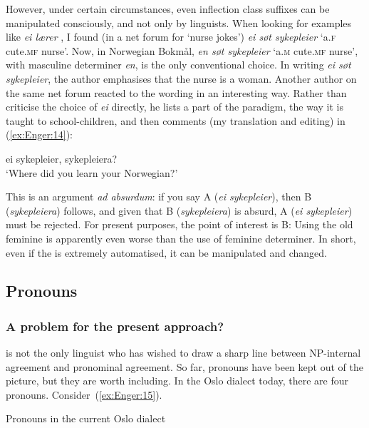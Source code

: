 \documentclass[output=paper]{langsci/langscibook}
\begin{document}
\begin{exe}
\begin{xlist}
\begin{xlist}
However, under certain circumstances, even inflection class suffixes can
be manipulated consciously, and not only by linguists. When looking for
examples like \emph{ei lærer} %
\citep[Section 2.4.2,][]{Enger15}%
%
, I found (in a net
forum for `nurse jokes') \emph{ei søt sykepleier} `a.\textsc{f} cute.\textsc{mf} nurse'.
Now, in Norwegian Bokmål, \emph{en søt sykepleier} `a.\textsc{m} cute.\textsc{mf} nurse',
with masculine determiner \emph{en}, is the only conventional choice. In
writing \emph{ei søt sykepleier}, the author emphasises that the nurse
is a woman. Another author on the same net forum reacted to the wording
in an interesting way. Rather than criticise the choice of \emph{ei}
directly, he lists a part of the paradigm, the way it is taught to
school-children, and then comments (my translation and editing) in (\ref{ex:Enger:14}):

\ea\label{ex:Enger:14} {ei sykepleier, sykepleiera}?\\
\glt `Where did you learn your
Norwegian?'
\z

This is an argument \emph{ad absurdum}: if you say A (\emph{ei
sykepleier}), then B (\emph{sykepleiera}) follows, and given that B
(\emph{sykepleiera}) is absurd, A (\emph{ei sykepleier}) must be
rejected. For present purposes, the point of interest is B: Using the
old feminine  is apparently even worse than the use of feminine
determiner. In short, even if the  is extremely automatised, it
can be manipulated and changed.

\subsection{Pronouns}
\label{sec:enger:4.2}

\subsubsection{A problem for the present approach?}

%
\citet{Lehmann82,Lehmann16} %
%
is not the only linguist who has wished to draw a
sharp line between NP-internal agreement and pronominal agreement. So
far, pronouns have been kept out of the picture, but they are worth
including. In the Oslo dialect today, there are four pronouns. Consider~(\ref{ex:Enger:15}).

\ea\label{ex:Enger:15} Pronouns in the current Oslo dialect


\end{xlist}
\end{xlist}
\end{exe}
\end{document}

